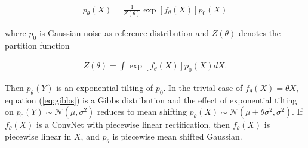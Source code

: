 \documentclass[11pt]{article}
\begin{document}
\begin{eqnarray}
p_\theta(X) = \frac{1}{Z(\theta)} \exp\left[ f_\theta(X)\right] p_0(X)
\label{eq:gibbs}
\end{eqnarray}

where $p_0$ is Gaussian noise as reference distribution and $Z(\theta)$ denotes the partition function

\begin{eqnarray}
Z(\theta) = \int\exp[f_\theta(X)]p_0(X)dX.
\end{eqnarray}

Then $p_\theta(Y)$ is an exponential tilting of $p_0$. In the trivial case of $f_\theta(X)=\theta X$, equation (\ref{eq:gibbs}) is a Gibbs distribution and the effect of exponential tilting on $p_0(Y)\sim\mathcal{N}(\mu,\sigma^2)$ reduces to mean shifting $p_\theta(X)\sim\mathcal{N}(\mu+\theta \sigma^2,\sigma^2)$. If $f_\theta(X)$ is a ConvNet with piecewise linear rectification, then $f_\theta(X)$ is piecewise linear in $X$, and $p_\theta$ is piecewise mean shifted Gaussian. 


 
\end{document}
